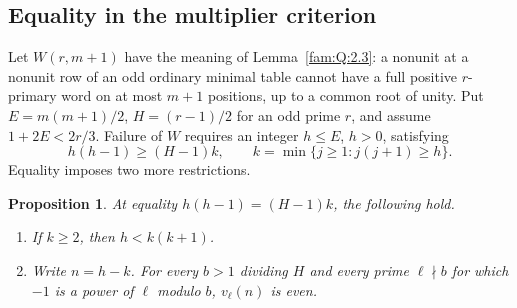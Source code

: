\documentclass[11pt,a4paper]{article}
\numberwithin{equation}{section}
\newtheorem{proposition}[theorem]{Proposition}
\theoremstyle{remark}
\begin{document}
\subsection{Equality in the multiplier criterion}
\label{por:sec:design}
Let $W(r,m+1)$ have the meaning of Lemma~\ref{fam:Q:2.3}: a nonunit at a nonunit row of an odd ordinary minimal table cannot have a full positive $r$-primary word on at most $m+1$ positions, up to a common root of unity. Put $E=m(m+1)/2$, $H=(r-1)/2$ for an odd prime $r$, and assume $1+2E<2r/3$. Failure of $W$ requires an integer $h\le E$, $h>0$, satisfying
\[
             h(h-1)\ge(H-1)k,\qquad k=\min\{j\ge1:j(j+1)\ge h\}.
\]
Equality imposes two more restrictions.

\begin{proposition}\label{por:pr:designrigid}
At equality $h(h-1)=(H-1)k$, the following hold.
\begin{enumerate}
\item If $k\ge2$, then $h<k(k+1)$.
\item Write $n=h-k$. For every $b>1$ dividing $H$ and every prime $\ell\nmid b$ for which $-1$ is a power of $\ell$ modulo $b$, $v_\ell(n)$ is even.
\end{enumerate}
\end{proposition}
\end{document}
